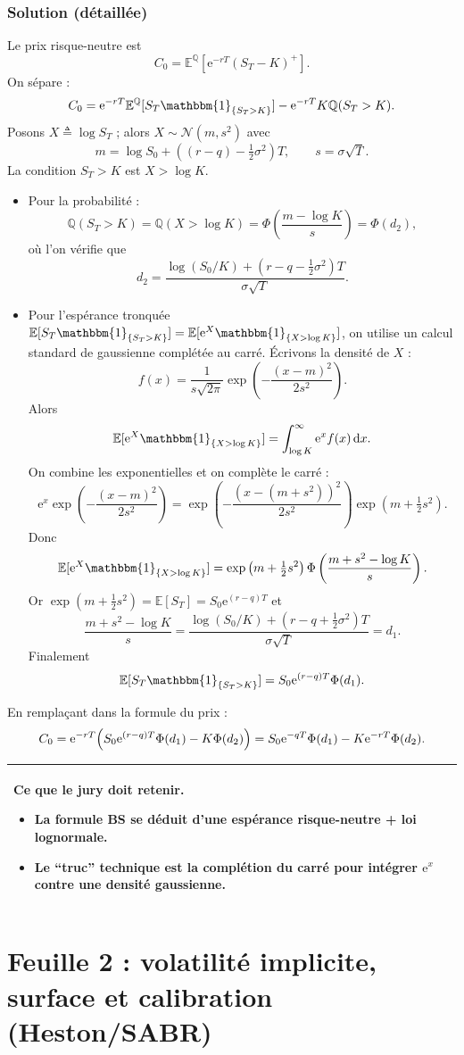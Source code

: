 \documentclass[11pt,a4paper]{report}
\newcommand{\dd}{\mathrm{d}}
\newcommand{\ee}{\mathrm{e}}
\newcommand{\E}{\mathbb{E}}
\newcommand{\Q}{\mathbb{Q}}
\newcommand{\1}{\mathbbm{1}}
\newcommand{\Normal}{\mathcal{N}}
\theoremstyle{definition}
\theoremstyle{plain}
\theoremstyle{remark}
\newenvironment{jurybox}{%
  \begin{center}
  \setlength{\tabcolsep}{6pt}%
  \renewcommand{\arraystretch}{1.1}%
  \begin{tabular}{|p{0.94\textwidth}|}
  \hline
  \small\textbf{Ce que le jury doit retenir.}\par\medskip
}{%
  \\ \hline
  \end{tabular}
  \end{center}
}
\begin{document}
\subsection*{Solution (détaillée)}
Le prix risque-neutre est
\[C_0=\E^{\Q}[\ee^{-rT}(S_T-K)^+].\]
On sépare :
\[C_0=\ee^{-rT}\E^{\Q}[S_T\1_{\{S_T>K\}}]-\ee^{-rT}K\Q(S_T>K).\]
Posons $X\triangleq\log S_T$ ; alors $X\sim\Normal(m,s^2)$ avec
\[m=\log S_0+\left((r-q)-\tfrac12\sigma^2\right)T,\qquad s=\sigma\sqrt{T}.
\]
La condition $S_T>K$ est $X>\log K$.
\begin{itemize}
  \item Pour la probabilité :
  \[\Q(S_T>K)=\Q(X>\log K)=\Phi\left(\frac{m-\log K}{s}\right)=\Phi(d_2),\]
  où l'on vérifie que
  \[d_2=\frac{\log(S_0/K)+(r-q-\tfrac12\sigma^2)T}{\sigma\sqrt{T}}.
  \]
  \item Pour l'espérance tronquée $\E[S_T\1_{\{S_T>K\}}]=\E[\ee^X\1_{\{X>\log K\}}]$,
  on utilise un calcul standard de gaussienne complétée au carré.
  Écrivons la densité de $X$ :
  \[f(x)=\frac{1}{s\sqrt{2\pi}}\exp\left(-\frac{(x-m)^2}{2s^2}\right).
  \]
  Alors
  \[\E[\ee^X\1_{\{X>\log K\}}]=\int_{\log K}^{\infty}\ee^x f(x)\,\dd x.
  \]
  On combine les exponentielles et on complète le carré :
  \[
  \ee^x\exp\left(-\frac{(x-m)^2}{2s^2}\right)
  =\exp\left(-\frac{(x-(m+s^2))^2}{2s^2}\right)\exp\left(m+\tfrac12 s^2\right).
  \]
  Donc
  \[\E[\ee^X\1_{\{X>\log K\}}]=\exp\left(m+\tfrac12 s^2\right)\Phi\left(\frac{m+s^2-\log K}{s}\right).
  \]
  Or $\exp(m+\tfrac12 s^2)=\E[S_T]=S_0\ee^{(r-q)T}$ et
  \[\frac{m+s^2-\log K}{s}=\frac{\log(S_0/K)+(r-q+\tfrac12\sigma^2)T}{\sigma\sqrt{T}}=d_1.
  \]
  Finalement
  \[\E[S_T\1_{\{S_T>K\}}]=S_0\ee^{(r-q)T}\Phi(d_1).
  \]
\end{itemize}
En remplaçant dans la formule du prix :
\[C_0=\ee^{-rT}\Bigl(S_0\ee^{(r-q)T}\Phi(d_1)-K\Phi(d_2)\Bigr)=S_0\ee^{-qT}\Phi(d_1)-K\ee^{-rT}\Phi(d_2).
\]

\begin{jurybox}
\begin{itemize}
  \item La formule BS se déduit d'une espérance risque-neutre + loi lognormale.
  \item Le ``truc'' technique est la complétion du carré pour intégrer $\ee^x$ contre une densité gaussienne.
\end{itemize}
\end{jurybox}

\chapter{Feuille 2 : volatilité implicite, surface et calibration (Heston/SABR)}
\label{chap:td2}
\end{document}
